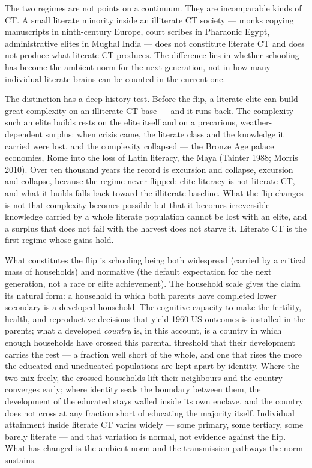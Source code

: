 \documentclass[12pt,letterpaper]{article}
\begin{document}
The two regimes are not points on a continuum. They are incomparable
kinds of CT. A small literate minority inside an illiterate CT
society --- monks copying manuscripts in ninth-century Europe, court
scribes in Pharaonic Egypt, administrative elites in Mughal India ---
does not constitute literate CT and does not produce what literate CT
produces. The difference lies in whether schooling has become the
ambient norm for the next generation, not in how many individual
literate brains can be counted in the current one.

The distinction has a deep-history test. Before the flip, a literate
elite can build great complexity on an illiterate-CT base --- and it
runs back. The complexity such an elite builds rests on the elite
itself and on a precarious, weather-dependent surplus: when crisis
came, the literate class and the knowledge it carried were lost, and
the complexity collapsed --- the Bronze Age palace economies, Rome into
the loss of Latin literacy, the Maya (Tainter 1988; Morris 2010). Over
ten thousand years the record is excursion and collapse, excursion and
collapse, because the regime never flipped: elite literacy is not
literate CT, and what it builds falls back toward the illiterate
baseline. What the flip changes is not that complexity becomes possible
but that it becomes irreversible --- knowledge carried by a whole
literate population cannot be lost with an elite, and a surplus that
does not fail with the harvest does not starve it. Literate CT is the
first regime whose gains hold.

What constitutes the flip is schooling being both widespread (carried
by a critical mass of households) and normative (the default
expectation for the next generation, not a rare or elite achievement).
The household scale gives the claim its natural form: a household
in which both parents have completed lower secondary is a developed
household. The cognitive capacity to make the fertility, health, and
reproductive decisions that yield 1960-US outcomes is installed in
the parents; what a developed \emph{country} is, in this account, is
a country in which enough households have crossed this parental
threshold that their development carries the rest --- a fraction well
short of the whole, and one that rises the more the educated and
uneducated populations are kept apart by identity. Where the two mix
freely, the crossed households lift their neighbours and the country
converges early; where identity seals the boundary between them, the
development of the educated stays walled inside its own enclave, and
the country does not cross at any fraction short of educating the
majority itself.
Individual attainment inside literate CT varies widely --- some
primary, some tertiary, some barely literate --- and that variation
is normal, not evidence against the flip. What has changed is the
ambient norm and the transmission pathways the norm sustains.
\end{document}
